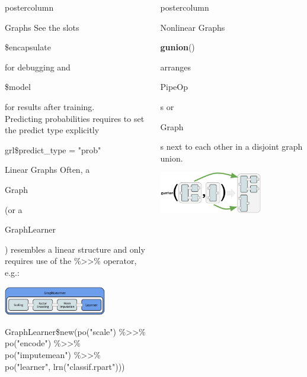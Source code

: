 \documentclass{beamer}
\newlength{\columnheight} %
\newcommand{\codeinline}[1]{\begin{codeboxinline}#1\end{codeboxinline}}
\begin{document}
\begin{frame}[fragile]{}
\begin{columns}
\begin{column}{.245\textwidth}
\begin{beamercolorbox}[center]{postercolumn}
\begin{minipage}{.98\textwidth}
{\begin{myblock}{Graphs}
              See the slots \codeinline{\$encapsulate} for debugging and \codeinline{\$model} for results after training.\\
              Predicting probabilities requires to set the predict type explicitly \codeinline{grl\$predict\_type = "prob"}
						\end{myblock}
            \begin{myblock}{Linear Graphs}
              Often, a \codeinline{Graph} (or a \codeinline{GraphLearner}) resembles a linear structure and only requires use of the \%>{}>\% operator, e.g.:
              \begin{center}
                \includegraphics[width=0.7\textwidth]{img/grl_linear.pdf}
              \end{center}
              \begin{codeboxmultiline}[width=27cm]
                GraphLearner\$new(po("scale") \%>{}>\%\\
                \hspace*{1ex} po("encode") \%>{}>\% po("imputemean") \%>{}>\% \\
                \hspace*{1ex} po("learner", lrn("classif.rpart")))
              \end{codeboxmultiline}
            \end{myblock}
						\vfill}
				\end{minipage}
			\end{beamercolorbox}
		\end{column}
		\begin{column}{.245\textwidth}
			\begin{beamercolorbox}[center]{postercolumn}
				\begin{minipage}{.98\textwidth}
					\parbox[t][\columnheight]{\textwidth}{
            \begin{myblock}{Nonlinear Graphs}
              \codeinline{\textbf{gunion}()} arranges \codeinline{PipeOp}s or \codeinline{Graph}s next to each other in a disjoint graph union.
              \begin{center}
                \includegraphics[width=0.7\textwidth]{img/gunion.pdf}

\end{center}
\end{myblock}}
\end{minipage}
\end{beamercolorbox}
\end{column}
\end{columns}
\end{frame}
\end{document}
